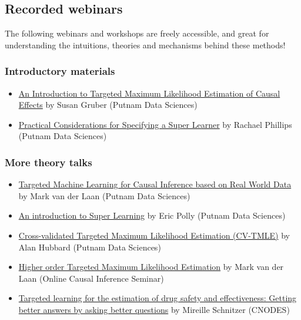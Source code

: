 \documentclass[
]{book}
\providecommand{\tightlist}{%
  \setlength{\itemsep}{0pt}\setlength{\parskip}{0pt}}
\begin{document}
\hypertarget{recorded-webinars}{%
\subsection{Recorded webinars}\label{recorded-webinars}}

The following webinars and workshops are freely accessible, and great for understanding the intuitions, theories and mechanisms behind these methods!

\hypertarget{introductory-materials}{%
\subsubsection{Introductory materials}\label{introductory-materials}}

\begin{itemize}
\tightlist
\item
  \href{https://www.youtube.com/watch?v=8Q9dfW3oOi4}{An Introduction to Targeted Maximum Likelihood Estimation of Causal Effects} by Susan Gruber (Putnam Data Sciences)
\item
  \href{https://www.youtube.com/watch?v=WYnjja8DKPg}{Practical Considerations for Specifying a Super Learner} by Rachael Phillips (Putnam Data Sciences)
\end{itemize}

\hypertarget{more-theory-talks}{%
\subsubsection{More theory talks}\label{more-theory-talks}}

\begin{itemize}
\tightlist
\item
  \href{https://www.youtube.com/watch?v=PrPNP5RVcLg}{Targeted Machine Learning for Causal Inference based on Real World Data} by Mark van der Laan (Putnam Data Sciences)
\item
  \href{https://www.youtube.com/watch?v=1zT17HtvtF8}{An introduction to Super Learning} by Eric Polly (Putnam Data Sciences)
\item
  \href{https://www.youtube.com/watch?v=MDmddX267Ys}{Cross-validated Targeted Maximum Likelihood Estimation (CV-TMLE)} by Alan Hubbard (Putnam Data Sciences)
\item
  \href{https://www.youtube.com/watch?v=2jumfnRQpxs}{Higher order Targeted Maximum Likelihood Estimation} by Mark van der Laan (Online Causal Inference Seminar)
\item
  \href{http://bcooltv.mcgill.ca/FDownloader.aspx?rid=e3143be2-918d-49d9-82ce-4dfea75ef1dc\&DLType=VGAMP4}{Targeted learning for the estimation of drug safety and effectiveness: Getting better answers by asking better questions} by Mireille Schnitzer (CNODES)
\end{itemize}
\end{document}
